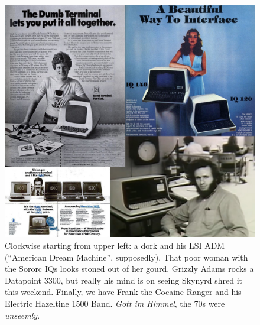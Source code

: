 \begin{figure}
  \centering \includegraphics[width=.9\linewidth]{media/dumbterminals.jpg}
\caption[Dumb terminals of the 1970s.]{Clockwise starting from upper left: a dork and his LSI ADM (``American
  Dream Machine'', supposedly). That poor woman with the Sororc IQs looks stoned out
  of her gourd. Grizzly Adams rocks a Datapoint 3300, but really his mind is on
  seeing Skynyrd shred it this weekend. Finally, we have Frank the Cocaine
  Ranger and his Electric Hazeltine 1500 Band. \textit{Gott im Himmel}, the 70s were \textit{unseemly}.}
\label{fig:terminals}
\end{figure}

